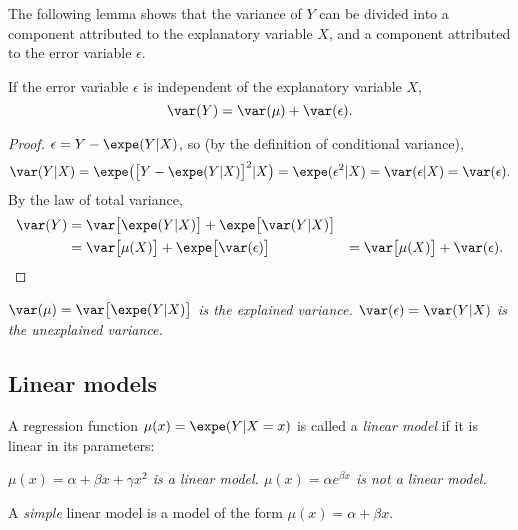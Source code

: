 The following lemma shows that the variance of $Y$ can be divided into a component attributed to the explanatory variable $X$, and a component attributed to the error variable $\epsilon$.
\begin{lemma}
If the error variable $\epsilon$ is independent of the explanatory variable $X$,
\[\var(Y) = \var(\mu) + \var(\epsilon).
\]
\end{lemma}
\begin{proof}
$\epsilon = Y - \expe(Y|X)$, so (by the definition of conditional variance),
\[
\var(Y|X) = \expe\big(\big[Y-\expe(Y|X)\big]^2|X\big) = \expe(\epsilon^2|X) = \var(\epsilon|X) = \var(\epsilon).
\]
By the law of total variance,
\begin{align*}
\var(Y) 
	& = \var\big[\expe(Y|X)\big] + \expe\big[\var(Y|X)\big] \\
	& = \var\big[\mu(X)\big] + \expe\big[\var(\epsilon)\big]
	& = \var\big[\mu(X)\big] + \var(\epsilon).
\end{align*}
\end{proof}

\begin{remark}
\bit
\it $\var(\mu) = \var\big[\expe(Y|X)\big]$ is the \emph{explained} variance.
\it $\var(\epsilon) = \var(Y|X)$ is the \emph{unexplained} variance.
\eit
\end{remark}


\subsection{Linear models}

\begin{definition}
A regression function $\mu(x)=\expe(Y|X=x)$ is called a \emph{linear model} if it is linear in its parameters:
\end{definition}
\bit
\it $\mu(x) = \alpha + \beta x + \gamma x^2$ is a linear model.
\it $\mu(x) = \alpha e^{\beta x}$ is not a linear model.
\eit

\begin{definition}
A \emph{simple} linear model is a model of the form $\mu(x) = \alpha + \beta x$.
\end{definition}

